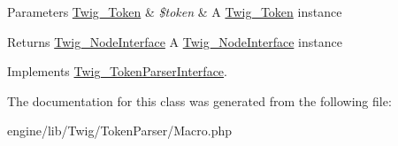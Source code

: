 \begin{DoxyParams}[1]{Parameters}
\hyperlink{class_twig___token}{Twig\+\_\+\+Token} & {\em \$token} & A \hyperlink{class_twig___token}{Twig\+\_\+\+Token} instance\\
\hline
\end{DoxyParams}
\begin{DoxyReturn}{Returns}
\hyperlink{interface_twig___node_interface}{Twig\+\_\+\+Node\+Interface} A \hyperlink{interface_twig___node_interface}{Twig\+\_\+\+Node\+Interface} instance 
\end{DoxyReturn}


Implements \hyperlink{interface_twig___token_parser_interface_a5dfa2e269321584fb74e8b43dabe0efd}{Twig\+\_\+\+Token\+Parser\+Interface}.



The documentation for this class was generated from the following file\+:\begin{DoxyCompactItemize}
\item 
engine/lib/\+Twig/\+Token\+Parser/Macro.\+php\end{DoxyCompactItemize}
